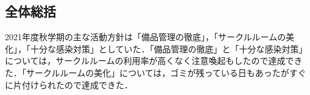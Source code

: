 \subsection*{全体総括}

2021年度秋学期の主な活動方針は「備品管理の徹底」，「サークルルームの美化」，「十分な感染対策」としていた．「備品管理の徹底」と「十分な感染対策」については，サークルルームの利用率が高くなく注意喚起もしたので達成できた．「サークルルームの美化」については，ゴミが残っている日もあったがすぐに片付けられたので達成できた．